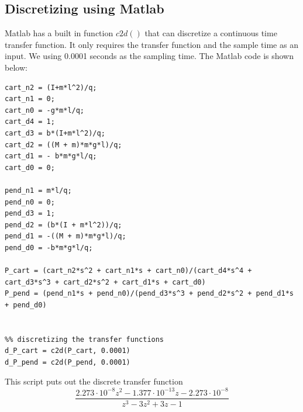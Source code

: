	\subsection{Discretizing using Matlab}
	Matlab has a built in function $c2d()$ that can discretize a continuous time transfer function. It only requires the transfer function and the sample time as an input. We using 0.0001 seconds as the sampling time. The Matlab code is shown below:
\begin{lstlisting}
cart_n2 = (I+m*l^2)/q;
cart_n1 = 0;
cart_n0 = -g*m*l/q;
cart_d4 = 1;
cart_d3 = b*(I+m*l^2)/q;
cart_d2 = ((M + m)*m*g*l)/q;
cart_d1 = - b*m*g*l/q;
cart_d0 = 0;

pend_n1 = m*l/q;
pend_n0 = 0;
pend_d3 = 1;
pend_d2 = (b*(I + m*l^2))/q;
pend_d1 = -((M + m)*m*g*l)/q;
pend_d0 = -b*m*g*l/q;

P_cart = (cart_n2*s^2 + cart_n1*s + cart_n0)/(cart_d4*s^4 + cart_d3*s^3 + cart_d2*s^2 + cart_d1*s + cart_d0)
P_pend = (pend_n1*s + pend_n0)/(pend_d3*s^3 + pend_d2*s^2 + pend_d1*s + pend_d0)


%% discretizing the transfer functions
d_P_cart = c2d(P_cart, 0.0001)
d_P_pend = c2d(P_pend, 0.0001)

\end{lstlisting}

This script puts out the discrete transfer function
\begin{equation}
	\frac{2.273\cdot 10^{-8}z^2-1.377\cdot 10^{-13} z-2.273\cdot 10^{-8}}{z^3-3z^2+3z-1}
\end{equation}
